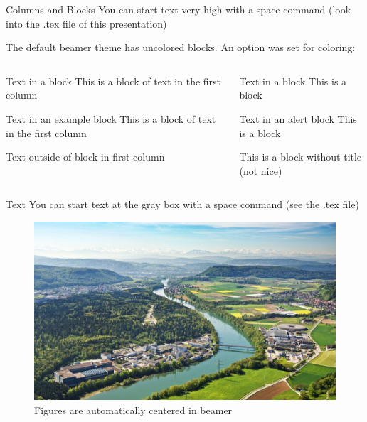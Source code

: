 \documentclass[aspectratio=43]{beamer} %
\begin{document}
\begin{frame}{Columns and Blocks}
  You can start text very high with a space command (look into the .tex file of this presentation)

 The default beamer theme has uncolored blocks. An option was set for coloring: 
  \begin{columns}
    \begin{column}[T]{0.6\linewidth}
      \begin{block}{Text in a block}
        This is a block of text in the first column
      \end{block}
      \begin{exampleblock}{Text in an example block}
        This is a block of text in the first column
      \end{exampleblock}
      Text outside of block in first column
    \end{column}
    \begin{column}[T]{0.4\linewidth}
      \begin{block}{Text in a block}
        This is a block 
      \end{block}
      \begin{alertblock}{Text in an alert block}
        This is a block
      \end{alertblock}
      \begin{block}{}
        This is a block without title (not nice)
      \end{block}
    \end{column}
  \end{columns}
    
    \PSIfill
 \end{frame}
 

 \begin{frame}{Text}
   \PSIvspace
  You can start text at the gray box with a space command (see the .tex file)
  \begin{figure}
    \includegraphics[width=0.3\pagewidth]{PSIlandscape}
    \caption{Figures are automatically centered in beamer}
    \label{fig:PSI}
    \end{figure}

     \PSIfill
\end{frame}
\end{document}
